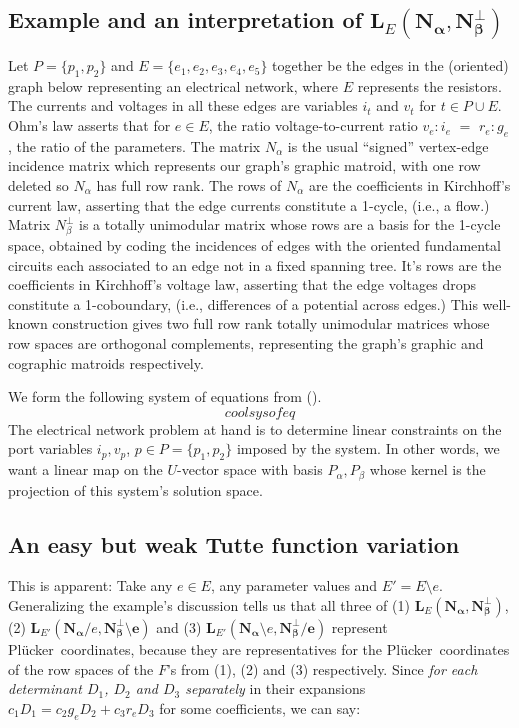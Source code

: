 \documentclass[Unicode]{cedram-alco}
\newcommand{\ext}[1]{\ensuremath{\mathbf{#1}}}
\newcommand{\Plucker}{Pl\"{u}cker\ }
\begin{document}
\subsection{Example and an interpretation of $\ext{L}_E(\ext{N_\alpha},\ext{N_\beta^\perp})$}\label{ExamK4}

Let $P=\{p_1, p_2\}$ and $E=\{e_1, e_2, e_3, e_4, e_5\}$ together be the edges in the (oriented) graph
below representing an electrical network, where $E$ represents the resistors.  The currents and voltages
in all these edges are variables $i_t$ and $v_t$ for $t\in P\cup E$.  Ohm's law
asserts that for $e\in E$, the ratio voltage-to-current ratio
$v_e:i_e$ $=$ $r_e:g_e$, the ratio of the parameters. The matrix $N_\alpha$ is the
usual ``signed'' vertex-edge incidence matrix which represents our graph's graphic matroid, with one
row deleted so $N_\alpha$ has full row rank.  The rows of $N_\alpha$ are the coefficients in
Kirchhoff's current law, asserting that the edge currents constitute a 1-cycle, (i.e., a flow.)
Matrix $N_\beta^\perp$ is a totally unimodular matrix whose
rows are a basis for the 1-cycle space, obtained by coding the incidences of edges with the oriented fundamental
circuits each associated to an edge not in a fixed spanning tree.  It's rows are the coefficients in
Kirchhoff's voltage law, asserting that the edge
voltages drops constitute a 1-coboundary, (i.e., differences
of a potential across edges.)
This well-known construction gives
two full row rank totally unimodular matrices whose row spaces are orthogonal complements,
representing the graph's
graphic and cographic matroids respectively.

We form the following system of equations from ().
\[
cool sys of eq
\]
The electrical network problem at hand is to determine linear constraints on the
port variables $i_p, v_p$, $p\in P = \{p_1, p_2\}$ imposed by the system.  In other words,
we want a linear map on the $U$-vector space with basis $P_\alpha, P_\beta$ whose kernel
is the projection of this system's solution space.


\subsection{An easy but weak Tutte function variation}

This is apparent:  Take any $e\in E$, any parameter
values and $E'=E\setminus e$. Generalizing the example's discussion tells us that all three of
(1) $\ext{L}_E(\ext{N_\alpha},\ext{N_\beta^\perp})$,
(2) $\ext{L}_{E'}(\ext{N_\alpha}/e,\ext{N_\beta^\perp\setminus e})$ and
(3) $\ext{L}_{E'}(\ext{N_\alpha}\setminus e,\ext{N_\beta^\perp/e})$ represent
\Plucker coordinates, because they are representatives for the \Plucker coordinates
of the row spaces of the $F$'s from (1), (2) and (3) respectively.  Since \emph{for each determinant
$D_1$, $D_2$ and $D_3$ separately} in their expansions $c_1 D_1 = c_2 g_e D_2 + c_3 r_e D_3$ for
some coefficients, we can say:
\end{document}
